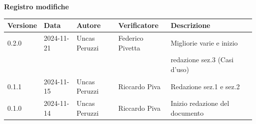 \documentclass[11pt]{article}
\begin{document}
\centering\textbf{Registro modifiche}\\
\vspace{2mm}
\begin{tabular}{|l|l|l|l|l|l|}
\hline
\textbf{Versione} & \textbf{Data} & \textbf{Autore} & \textbf{Verificatore} & \textbf{Descrizione} \\
\hline
0.2.0 & 2024-11-21 & Uncas Peruzzi  & Federico Pivetta & Migliorie varie e inizio\\
& & & & redazione sez.3 (Casi d'uso) \\
\hline
0.1.1 & 2024-11-15 & Uncas Peruzzi  & Riccardo Piva & Redazione sez.1 e sez.2 \\
\hline
0.1.0 & 2024-11-14 & Uncas Peruzzi  & Riccardo Piva & Inizio redazione del documento\\
\hline
\end{tabular}
\newpage
\tableofcontents
\listoffigures %
\end{document}
